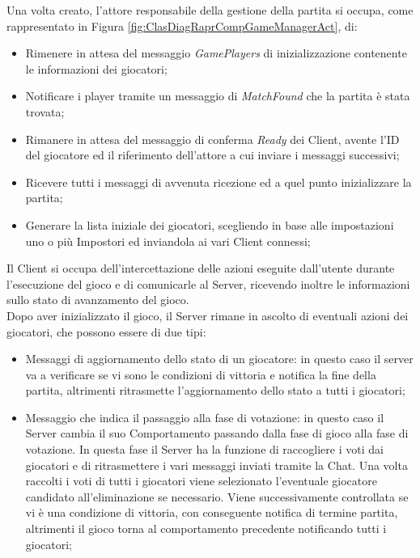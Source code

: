 Una volta creato, l'attore responsabile della gestione della partita si occupa, come rappresentato in Figura \ref{fig:ClasDiagRaprCompGameManagerAct}, di:
\begin{itemize}
    \item Rimenere in attesa del messaggio \textit{GamePlayers} di inizializzazione contenente le informazioni dei giocatori;
    \item Notificare i player tramite un messaggio di \textit{MatchFound} che la partita \`e stata trovata;
    \item Rimanere in attesa del messaggio di conferma \textit{Ready} dei Client, avente l'ID del giocatore ed il riferimento dell'attore a cui inviare i messaggi successivi;
    \item Ricevere tutti i messaggi di avvenuta ricezione ed a quel punto inizializzare la partita;
    \item Generare la lista iniziale dei giocatori, scegliendo in base alle impostazioni uno o pi\`u Impostori ed inviandola ai vari Client connessi;
\end{itemize}

Il Client si occupa dell'intercettazione delle azioni eseguite dall'utente durante l'esecuzione del gioco e di comunicarle al Server, ricevendo inoltre le informazioni sullo stato di avanzamento del gioco.\\
Dopo aver inizializzato il gioco, il Server rimane in ascolto di eventuali azioni dei giocatori, che possono essere di due tipi:
\begin{itemize}
    \item Messaggi di aggiornamento dello stato di un giocatore: in questo caso il server va a verificare se vi sono le condizioni di vittoria e notifica la fine della partita, altrimenti ritrasmette l'aggiornamento dello stato a tutti i giocatori;
    \item Messaggio che indica il passaggio alla fase di votazione: in questo caso il Server cambia il suo Comportamento passando dalla fase di gioco alla fase di votazione. In questa fase il Server ha la funzione di raccogliere i voti dai giocatori e di ritrasmettere i vari messaggi inviati tramite la Chat. Una volta raccolti i voti di tutti i giocatori viene selezionato l'eventuale giocatore candidato all'eliminazione se necessario. Viene successivamente controllata se vi \`e una condizione di vittoria, con conseguente notifica di termine partita, altrimenti il gioco torna al comportamento precedente notificando tutti i giocatori;
\end{itemize} 

